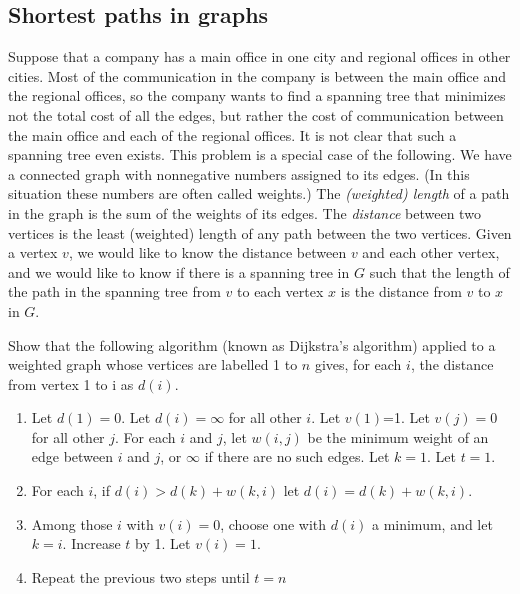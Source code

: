 \subsection{Shortest paths in graphs}  Suppose that a company has a
main office in one city and regional offices in other cities.  Most of
the communication in the company is between the main office and the
regional offices, so the company wants to find a spanning tree that
minimizes not the total cost of all the edges, but rather the cost of
communication between the main office and each of the regional offices.
It is not clear that such a spanning tree even exists.   This problem is
a special case of the following.  We have a connected graph with nonnegative
numbers assigned to its edges.  (In this situation these numbers are often
called weights.)  The {\em (weighted) length} of a path in the graph is the sum of the weights
of its edges.  The {\em distance} between two vertices is  the least
(weighted) length of any path between the two vertices.  Given a vertex
$v$, we would like to know the distance between $v$ and each other
vertex, and we would like to know if there is a spanning tree in $G$ such
that the length of the path in the spanning tree from $v$ to each vertex
$x$  is the distance from $v$ to $x$ in $G$.
\bp \item\label{Dijkstra}
Show that the following algorithm (known as
Dijkstra's
algorithm) applied to a weighted graph whose vertices are labelled 1 to
$n$ gives, for each
$i$, the distance from vertex 1 to i as
$d(i)$.
\begin{enumerate}
\item Let $d(1) = 0$. Let $d(i) = \infty$ for all other $i$.  Let
$v(1)$=1. Let
$v(j) = 0$ for all other
$j$.  For each $i$ and $j$, let $w(i,j)$ be the minimum weight of an edge
between $i$ and $j$, or $\infty$ if there are no such edges.  Let
$k=1$.  Let $t=1$.
\item For each $i$, if $d(i)>d(k) + w(k,i)$ let $d(i)= d(k) +w(k,i)$.
\item Among those $i$ with $v(i)=0$, choose one with $d(i)$ a minimum,
and let $k=i$.  Increase $t$ by 1. Let $v(i) =1.$
\item Repeat the previous two steps until $t=n$ 
\end{enumerate} 
